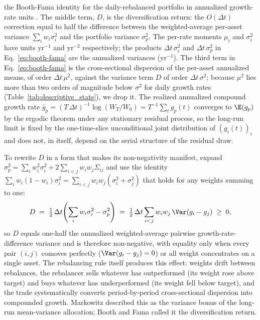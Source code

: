 the Booth-Fama identity for the daily-rebalanced portfolio in
annualized growth-rate units \cite{boothFama1992,
markowitz1976longRun}. The middle term, $D$, is the diversification
return: the $O(\Delta t)$ correction equal to half the difference
between the weighted-average per-asset variance $\sum_i w_i \sigma_i^2$
and the portfolio variance $\sigma_p^2$. The per-rate
moments $\mu_i$ and $\sigma_i^2$
have units $\mathrm{yr}^{-1}$ and $\mathrm{yr}^{-2}$ respectively;
the products $\Delta t\,\sigma_i^2$ and $\Delta t\,\sigma_p^2$ in
Eq.~\eqref{eq:booth-fama} are the annualized variances
($\mathrm{yr}^{-1}$). The
third term in Eq.~\eqref{eq:booth-fama} is the cross-sectional
dispersion of the per-asset annualized means, of order
$\Delta t\,\mu^2$, against the variance term $D$ of order
$\Delta t\,\sigma^2$; because $\mu^2$ lies more than two orders of magnitude
below $\sigma^2$ for daily growth rates
(Table~\ref{tab:descriptive_stats}), we drop it. The realized
annualized compound
growth rate $\bar g_p = (T\,\Delta t)^{-1}\log(W_T/W_0) =
T^{-1}\sum_{t} g_p(t)$ converges to $\E(g_p)$ by the ergodic
theorem under any stationary residual process, so the long-run
limit is fixed by the one-time-slice unconditional joint
distribution of $(g_i(t))_i$ and does not, in itself, depend on
the serial structure of the residual draw.

To rewrite $D$ in a form that makes its non-negativity manifest,
expand $\sigma_p^2 = \sum_i w_i^2 \sigma_i^2 + 2 \sum_{i<j} w_i w_j
\Sigma_{ij}$ and use the identity $\sum_i w_i (1 - w_i) \sigma_i^2 =
\sum_{i<j} w_i w_j (\sigma_i^2 + \sigma_j^2)$ that holds for any
weights summing to one:
\begin{equation}
  D \;=\; \tfrac{1}{2}\,\Delta t\!\left(\sum_i w_i \sigma_i^2 - \sigma_p^2\right)
  \;=\; \tfrac{1}{2}\,\Delta t \sum_{i<j} w_i w_j \,\Var(g_i - g_j) \;\ge\; 0,
  \label{eq:dr-pairwise}
\end{equation}
so $D$ equals one-half the annualized weighted-average pairwise
growth-rate-difference variance and is therefore non-negative, with equality only when every
pair $(i,j)$ comoves perfectly ($\Var(g_i - g_j) = 0$) or all weight
concentrates on a single asset. The rebalancing rule itself produces
this effect: weights drift between rebalances, the rebalancer sells
whatever has outperformed (its weight rose above target) and buys
whatever has underperformed (its weight fell below target), and the
trade systematically converts period-by-period cross-sectional
dispersion into compounded growth. Markowitz
\cite{markowitz1976longRun} described this as the variance bonus of
the long-run mean-variance allocation; Booth and Fama
\cite{boothFama1992} called it the diversification return.

